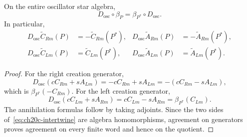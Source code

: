 \begin{lemma}
\label{lem:ch20c-intertwine}
On the entire oscillator star algebra,
\begin{equation}
 D_{\mathrm{osc}}\circ\beta_P
 =\beta_{P^*}\circ D_{\mathrm{osc}}.
 \label{eq:ch20c-intertwine}
\end{equation}
In particular,
\begin{align}
 D_{\mathrm{osc}}\widetilde C_{Rm}(P)
   &=-\widetilde C_{Rm}(P^*),&
 D_{\mathrm{osc}}\widetilde A_{Rm}(P)
   &=-\widetilde A_{Rm}(P^*),\nonumber\\
 D_{\mathrm{osc}}\widetilde C_{Lm}(P)
   &=\widetilde C_{Lm}(P^*),&
 D_{\mathrm{osc}}\widetilde A_{Lm}(P)
   &=\widetilde A_{Lm}(P^*).
 \label{eq:ch20c-dressed-transform}
\end{align}
\end{lemma}
\begin{proof}
For the right creation generator,
\[
 D_{\mathrm{osc}}(cC_{Rm}+sA_{Lm})
   =-cC_{Rm}+sA_{Lm}
   =-(cC_{Rm}-sA_{Lm}),
\]
which is $\beta_{P^*}(-C_{Rm})$.  For the left creation generator,
\[
 D_{\mathrm{osc}}(cC_{Lm}+sA_{Rm})
   =cC_{Lm}-sA_{Rm}=\beta_{P^*}(C_{Lm}).
\]
The annihilation formulas follow by taking adjoints.  Since the two
sides of~\eqref{eq:ch20c-intertwine} are algebra homomorphisms,
agreement on generators proves agreement on every finite word and
hence on the quotient.
\end{proof}

